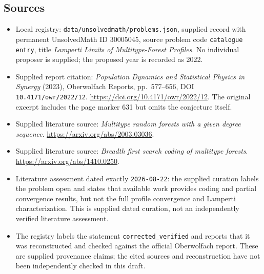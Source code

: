 \documentclass[11pt]{article}
\begin{document}
\subsection{Sources}
\begin{itemize}
\item Local registry: \texttt{data/unsolvedmath/problems.json}, supplied record with permanent UnsolvedMath ID \(30005045\), source problem code \texttt{catalogue entry}, title \emph{Lamperti Limits of Multitype-Forest Profiles}. No individual proposer is supplied; the proposed year is recorded as 2022.
\item Supplied report citation: \emph{Population Dynamics and Statistical Physics in Synergy} (2023), Oberwolfach Reports, pp.~577--656, DOI \texttt{10.4171/owr/2022/12}. \url{https://doi.org/10.4171/owr/2022/12}. The original excerpt includes the page marker 631 but omits the conjecture itself.
\item Supplied literature source: \emph{Multitype random forests with a given degree sequence}. \url{https://arxiv.org/abs/2003.03036}.
\item Supplied literature source: \emph{Breadth first search coding of multitype forests}. \url{https://arxiv.org/abs/1410.0250}.
\item Literature assessment dated exactly \texttt{2026-08-22}: the supplied curation labels the problem open and states that available work provides coding and partial convergence results, but not the full profile convergence and Lamperti characterization. This is supplied dated curation, not an independently verified literature assessment.
\item The registry labels the statement \texttt{corrected\_verified} and reports that it was reconstructed and checked against the official Oberwolfach report. These are supplied provenance claims; the cited sources and reconstruction have not been independently checked in this draft.
\end{itemize}
\end{document}
